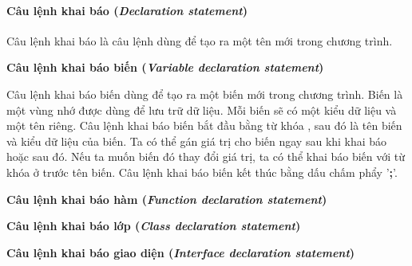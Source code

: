 \paragraph{Câu lệnh khai báo (\textit{Declaration statement})}

\regexdeclstmt

Câu lệnh khai báo là câu lệnh dùng để tạo ra một tên mới trong chương trình. 

\noindent\textbf{Câu lệnh khai báo biến (\textit{Variable declaration statement})}

\regexvardeclstmt

Câu lệnh khai báo biến dùng để tạo ra một biến mới trong chương trình. Biến là một vùng nhớ được dùng để lưu trữ dữ liệu. Mỗi biến sẽ có một kiểu dữ liệu và một tên riêng. Câu lệnh khai báo biến bắt đầu bằng từ khóa , sau đó là tên biến và kiểu dữ liệu của biến. Ta có thể gán giá trị cho biến ngay sau khi khai báo hoặc sau đó. Nếu ta muốn biến đó thay đổi giá trị, ta có thể khai báo biến với từ khóa  ở trước tên biến. Câu lệnh khai báo biến kết thúc bằng dấu chấm phẩy '\textbf{;}'.

\noindent\textbf{Câu lệnh khai báo hàm (\textit{Function declaration statement})}

\noindent\textbf{Câu lệnh khai báo lớp (\textit{Class declaration statement})}

\noindent\textbf{Câu lệnh khai báo giao diện (\textit{Interface declaration statement})}
